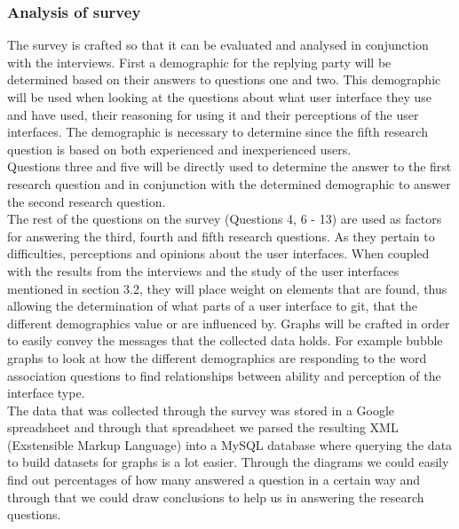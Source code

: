 \documentclass[a4paper,oneside]{bth} %
\begin{document}
					\subsubsection*{Analysis of survey}
					The survey is crafted so that it can be evaluated and analysed in conjunction with the interviews. 
					First a demographic for the replying party will be determined based on their answers to questions one and two. This demographic will be used when looking at the questions about what user interface they use and have used, their reasoning for using it and their perceptions of the user interfaces. The demographic is necessary to determine since the fifth research question is based on both experienced and inexperienced users.
					\\
					Questions three and five will be directly used to determine the answer to the first research question and in conjunction with the determined demographic to answer the second research question.
					\\
					The rest of the questions on the survey (Questions 4, 6 - 13) are used as factors for answering the third, fourth and fifth research questions. As they pertain to difficulties, perceptions and opinions about the user interfaces. When coupled with the results from the interviews and the study of the user interfaces mentioned in section 3.2, they will place weight on elements that are found, thus allowing the determination of what parts of a user interface to git, that the different demographics value or are influenced by. Graphs will be crafted in order to easily convey the messages that the collected data holds. For example bubble graphs to look at how the different demographics are responding to the word association questions to find relationships between ability and perception of the interface type. 
					\\
					The data that was collected through the survey was stored in a Google spreadsheet \cite{GoogleSpreadsheet} and through that spreadsheet we parsed the resulting XML (Exstensible Markup Language) into a MySQL database where querying the data to build datasets for graphs is a lot easier.
					Through the diagrams we could easily find out percentages of how many answered a question in a certain way and through that we could draw conclusions to help us in answering the research questions.
					
				
\end{document}
